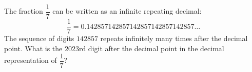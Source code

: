 The fraction $\dfrac{1}{7}$ can be written as an infinite repeating decimal: \[\dfrac{1}{7}=0.142857142857142857142857142857\ldots\]The sequence of digits $142857$ repeats infinitely many times after the decimal point. What is the $2023$rd digit after the decimal point in the decimal representation of $\dfrac{1}{7}$?
